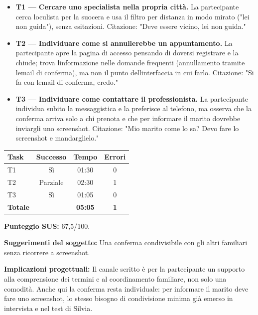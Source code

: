 \begin{itemize}
\item
  \textbf{T1 --- Cercare uno specialista nella propria città.}
  La partecipante cerca
  l\textquotesingle oculista per la suocera e usa il filtro per
  distanza in modo mirato ("lei non guida"), senza esitazioni.
  Citazione: "Deve essere vicino, lei non guida."
\item
  \textbf{T2 --- Individuare come si annullerebbe un appuntamento.}
  La partecipante apre la
  pagina di accesso pensando di doversi registrare e la chiude; trova
  l\textquotesingle informazione nelle domande frequenti
  (annullamento tramite l\textquotesingle email di conferma), ma non
  il punto dell\textquotesingle interfaccia in cui farlo. Citazione:
  "Si fa con l\textquotesingle email di conferma, credo."
\item
  \textbf{T3 --- Individuare come contattare il professionista.}
  La partecipante individua
  subito la messaggistica e la preferisce al telefono, ma osserva che
  la conferma arriva solo a chi prenota e che per informare il marito
  dovrebbe inviargli uno screenshot. Citazione: "Mio marito come lo
  sa? Devo fare lo screenshot e mandarglielo."
\end{itemize}

\begin{center}
\begin{minipage}{\linewidth}
\centering
{}\label{tab:a-11}
\noindent\begin{tabular}{lccc}
\toprule
\textbf{Task} & \textbf{Successo} & \textbf{Tempo} & \textbf{Errori} \\
\midrule
T1 & Sì & 01:30 & 0 \\
T2 & Parziale & 02:30 & 1 \\
T3 & Sì & 01:05 & 0 \\
\midrule
\textbf{Totale} & & \textbf{05:05} & \textbf{1} \\
\bottomrule
\end{tabular}
\end{minipage}
\end{center}

\textbf{Punteggio SUS:} 67,5/100.

\textbf{Suggerimenti del soggetto:} Una conferma condivisibile con
gli altri familiari senza ricorrere a screenshot.

\textbf{Implicazioni progettuali:} Il canale scritto è per la
partecipante un supporto alla comprensione dei termini e al coordinamento
familiare, non solo una comodità. Anche qui la conferma resta individuale: per informare il
marito deve fare uno screenshot, lo stesso bisogno di condivisione
minima già emerso in intervista e nel test di Silvia.

